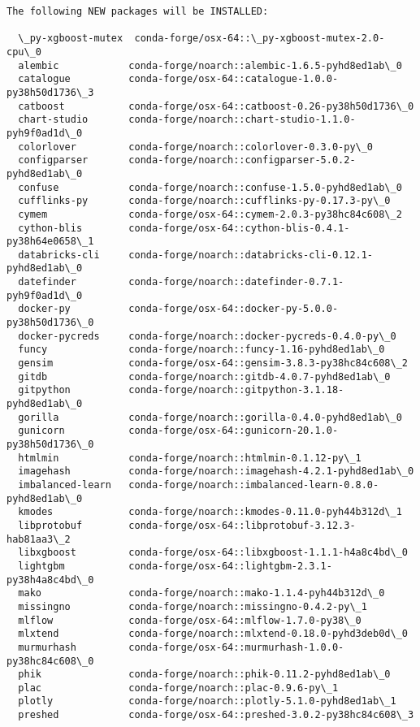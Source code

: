 \documentclass[11pt]{article}
\begin{document}
\begin{Verbatim}[commandchars=\\\{\}]
The following NEW packages will be INSTALLED:

  \_py-xgboost-mutex  conda-forge/osx-64::\_py-xgboost-mutex-2.0-cpu\_0
  alembic            conda-forge/noarch::alembic-1.6.5-pyhd8ed1ab\_0
  catalogue          conda-forge/osx-64::catalogue-1.0.0-py38h50d1736\_3
  catboost           conda-forge/osx-64::catboost-0.26-py38h50d1736\_0
  chart-studio       conda-forge/noarch::chart-studio-1.1.0-pyh9f0ad1d\_0
  colorlover         conda-forge/noarch::colorlover-0.3.0-py\_0
  configparser       conda-forge/noarch::configparser-5.0.2-pyhd8ed1ab\_0
  confuse            conda-forge/noarch::confuse-1.5.0-pyhd8ed1ab\_0
  cufflinks-py       conda-forge/noarch::cufflinks-py-0.17.3-py\_0
  cymem              conda-forge/osx-64::cymem-2.0.3-py38hc84c608\_2
  cython-blis        conda-forge/osx-64::cython-blis-0.4.1-py38h64e0658\_1
  databricks-cli     conda-forge/noarch::databricks-cli-0.12.1-pyhd8ed1ab\_0
  datefinder         conda-forge/noarch::datefinder-0.7.1-pyh9f0ad1d\_0
  docker-py          conda-forge/osx-64::docker-py-5.0.0-py38h50d1736\_0
  docker-pycreds     conda-forge/noarch::docker-pycreds-0.4.0-py\_0
  funcy              conda-forge/noarch::funcy-1.16-pyhd8ed1ab\_0
  gensim             conda-forge/osx-64::gensim-3.8.3-py38hc84c608\_2
  gitdb              conda-forge/noarch::gitdb-4.0.7-pyhd8ed1ab\_0
  gitpython          conda-forge/noarch::gitpython-3.1.18-pyhd8ed1ab\_0
  gorilla            conda-forge/noarch::gorilla-0.4.0-pyhd8ed1ab\_0
  gunicorn           conda-forge/osx-64::gunicorn-20.1.0-py38h50d1736\_0
  htmlmin            conda-forge/noarch::htmlmin-0.1.12-py\_1
  imagehash          conda-forge/noarch::imagehash-4.2.1-pyhd8ed1ab\_0
  imbalanced-learn   conda-forge/noarch::imbalanced-learn-0.8.0-pyhd8ed1ab\_0
  kmodes             conda-forge/noarch::kmodes-0.11.0-pyh44b312d\_1
  libprotobuf        conda-forge/osx-64::libprotobuf-3.12.3-hab81aa3\_2
  libxgboost         conda-forge/osx-64::libxgboost-1.1.1-h4a8c4bd\_0
  lightgbm           conda-forge/osx-64::lightgbm-2.3.1-py38h4a8c4bd\_0
  mako               conda-forge/noarch::mako-1.1.4-pyh44b312d\_0
  missingno          conda-forge/noarch::missingno-0.4.2-py\_1
  mlflow             conda-forge/osx-64::mlflow-1.7.0-py38\_0
  mlxtend            conda-forge/noarch::mlxtend-0.18.0-pyhd3deb0d\_0
  murmurhash         conda-forge/osx-64::murmurhash-1.0.0-py38hc84c608\_0
  phik               conda-forge/noarch::phik-0.11.2-pyhd8ed1ab\_0
  plac               conda-forge/noarch::plac-0.9.6-py\_1
  plotly             conda-forge/noarch::plotly-5.1.0-pyhd8ed1ab\_1
  preshed            conda-forge/osx-64::preshed-3.0.2-py38hc84c608\_3

\end{Verbatim}
\end{document}
